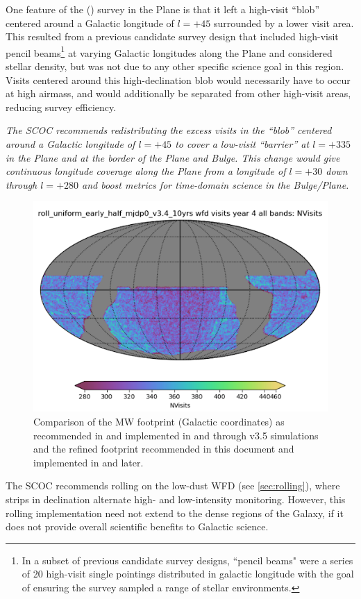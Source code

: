 One feature of the  () survey in the Plane is that it left a high-visit ``blob'' centered around a Galactic longitude of $l=+45$ surrounded by a lower visit area. This resulted from a previous candidate survey design that included high-visit pencil beams\footnote{In a subset of previous candidate survey designs, ``pencil beams" were a series of 20 high-visit single pointings distributed in galactic longitude with the goal of ensuring the survey sampled a range of stellar environments.} at varying Galactic longitudes along the Plane and considered stellar density, but was not due to any other specific science goal in this region. Visits centered around this high-declination blob would necessarily have to occur at high airmass, and would additionally be separated from other high-visit areas, reducing survey efficiency.

{\it The SCOC recommends redistributing the excess visits in the ``blob'' centered around a Galactic longitude of $l=+45$ to cover a low-visit ``barrier'' at $l=+335$ in the Plane and at the border of the Plane and Bulge. This change would give continuous longitude coverage along the Plane from a longitude of $l=+30$ down through $l=+280$ and boost metrics for time-domain science in the Bulge/Plane.}


\begin{figure}
\centering
    \includegraphics[width=0.3\linewidth]{figures/RollingUniform.png}
    \caption{Comparison of the MW footprint (Galactic coordinates) as recommended in  and implemented in  and through v3.5 simulations and the refined footprint recommended in this document and implemented in  and later.}
\end{figure}

The SCOC recommends rolling on the low-dust WFD (see \autoref{sec:rolling}), where strips in declination alternate high- and low-intensity monitoring. %
However, this rolling implementation need not extend to the dense regions of the Galaxy, if it does not provide overall scientific benefits to Galactic science.

